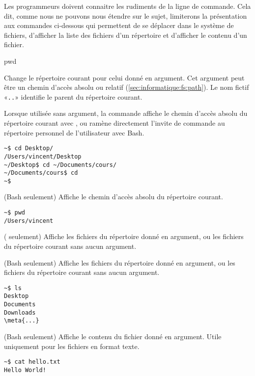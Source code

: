 Les programmeurs doivent connaitre les rudiments de la ligne de
commande. Cela dit, comme nous ne pouvons nous étendre sur le sujet,
limiterons la présentation aux commandes ci-dessous qui permettent de
se déplacer dans le système de fichiers, d'afficher la liste des
fichiers d'un répertoire et d'afficher le contenu d'un fichier.


\begin{ttscript}{pwd}
\item[\Icode{cd}] Change le répertoire courant pour
  celui donné en argument. Cet argument peut être un chemin d'accès
  absolu ou relatif (\autoref{sec:informatique:fs:path}). Le nom
  fictif «\verb=..=» identifie le parent du répertoire courant.

  Lorsque utilisée sans argument, la commande affiche le chemin
  d'accès absolu du répertoire courant avec , ou ramène
  directement l'invite de commande au répertoire personnel de
  l'utilisateur avec Bash.
  \begin{Schunk}
\begin{Verbatim}
~$ cd Desktop/
/Users/vincent/Desktop
~/Desktop$ cd ~/Documents/cours/
~/Documents/cours$ cd
~$
\end{Verbatim}
  \end{Schunk}
\item[\Icode{pwd}] (Bash seulement) Affiche le chemin
  d'accès absolu du répertoire courant.
  \begin{Schunk}
\begin{Verbatim}
~$ pwd
/Users/vincent
\end{Verbatim}
  \end{Schunk} %
\item[\Icode{dir}] (
  seulement) Affiche les fichiers du répertoire donné en argument, ou
  les fichiers du répertoire courant sans aucun argument.
\item[\code{ls}]  (Bash
  seulement) Affiche les fichiers du répertoire donné en argument, ou
  les fichiers du répertoire courant sans aucun argument.
  \begin{Schunk}
\begin{Verbatim}[commandchars=\\\{\}]
~$ ls
Desktop
Documents
Downloads
\meta{...}
\end{Verbatim}
  \end{Schunk} %
\item[\Icode{cat}] (Bash seulement) Affiche le contenu du
  fichier donné en argument. Utile uniquement pour les fichiers en
  format texte.
  \begin{Schunk}
\begin{Verbatim}
~$ cat hello.txt
Hello World!
\end{Verbatim}
  \end{Schunk} %
\end{ttscript}

